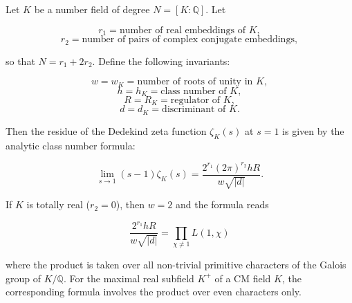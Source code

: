 Let $K$ be a number field of degree $N = [K : \mathbb{Q}]$. Let

$$r_1 = \text{number of real embeddings of } K,$$
$$r_2 = \text{number of pairs of complex conjugate embeddings},$$

so that $N = r_1 + 2r_2$. Define the following invariants:

$$w = w_K = \text{number of roots of unity in } K,$$
$$h = h_K = \text{class number of } K,$$
$$R = R_K = \text{regulator of } K,$$
$$d = d_K = \text{discriminant of } K.$$

Then the residue of the Dedekind zeta function $\zeta_K(s)$ at $s = 1$ is given by the analytic class number formula:

$$\lim_{s \to 1} (s - 1) \zeta_K(s) = \frac{2^{r_1} (2\pi)^{r_2} h R}{w \sqrt{|d|}}.$$

If $K$ is totally real ($r_2 = 0$), then $w = 2$ and the formula reads

$$\frac{2^{r_1} h R}{w \sqrt{|d|}} = \prod_{\chi \neq 1} L(1, \chi)$$

where the product is taken over all non-trivial primitive characters of the Galois group of $K/\mathbb{Q}$. For the maximal real subfield $K^+$ of a CM field $K$, the corresponding formula involves the product over even characters only.
